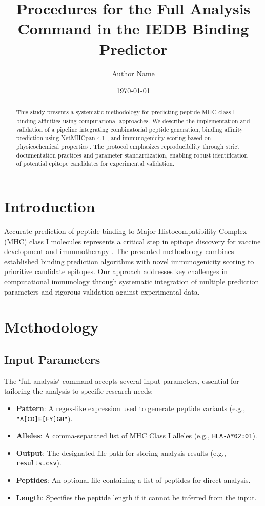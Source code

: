 \documentclass{article}
\title{Procedures for the Full Analysis Command in the IEDB Binding Predictor}
\author{Author Name}
\date{\today}
\begin{document}
\maketitle

\begin{abstract}
This study presents a systematic methodology for predicting peptide-MHC class I binding affinities using computational approaches. We describe the implementation and validation of a pipeline integrating combinatorial peptide generation, binding affinity prediction using NetMHCpan 4.1 \citep{reynisson2020netmhcpan}, and immunogenicity scoring based on physicochemical properties \citep{smith2020immunogenicity}. The protocol emphasizes reproducibility through strict documentation practices and parameter standardization, enabling robust identification of potential epitope candidates for experimental validation.
\end{abstract}

\section{Introduction}
Accurate prediction of peptide binding to Major Histocompatibility Complex (MHC) class I molecules represents a critical step in epitope discovery for vaccine development and immunotherapy \citep{andreatta2016netmhcpan}. The presented methodology combines established binding prediction algorithms with novel immunogenicity scoring to prioritize candidate epitopes. Our approach addresses key challenges in computational immunology through systematic integration of multiple prediction parameters and rigorous validation against experimental data.

\section{Methodology}

\subsection{Input Parameters}
The `full-analysis` command accepts several input parameters, essential for tailoring the analysis to specific research needs:
\begin{itemize}
    \item \textbf{Pattern}: A regex-like expression used to generate peptide variants (e.g., \texttt{"A[CD]E[FY]GH"}).
    \item \textbf{Alleles}: A comma-separated list of MHC Class I alleles (e.g., \texttt{HLA-A*02:01}).
    \item \textbf{Output}: The designated file path for storing analysis results (e.g., \texttt{results.csv}).
    \item \textbf{Peptides}: An optional file containing a list of peptides for direct analysis.
    \item \textbf{Length}: Specifies the peptide length if it cannot be inferred from the input.
\end{itemize}
\end{document}
